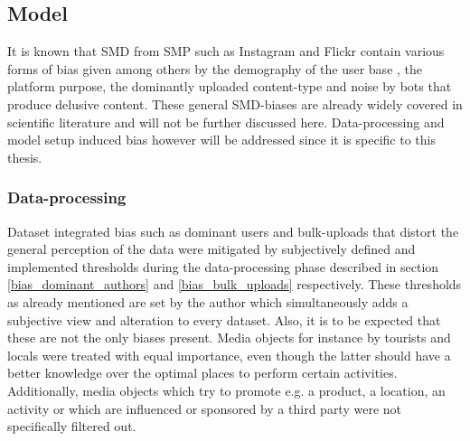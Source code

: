\subsection*{Model}
It is known that SMD from SMP such as Instagram and Flickr contain various forms of bias given among others by the demography of the user base \parencite{Heikinheimo2017}, the platform purpose, the dominantly uploaded content-type and noise by bots \parencite{Edwards2014} that produce delusive content. These general SMD-biases are already widely covered in scientific literature \parencite{Ruths2014, Lazer2014, Zook2017} and will not be further discussed here. Data-processing and model setup induced bias however will be addressed since it is specific to this thesis. \\

\subsubsection*{Data-processing} Dataset integrated bias such as dominant users and bulk-uploads that distort the general perception of the data were mitigated by subjectively defined and implemented thresholds during the data-processing phase described in section \ref{bias_dominant_authors} and \ref{bias_bulk_uploads} respectively. These thresholds as already mentioned are set by the author which simultaneously adds a subjective view and alteration to every dataset. Also, it is to be expected that these are not the only biases present. Media objects for instance by tourists and locals were treated with equal importance, even though the latter should have a better knowledge over the optimal places to perform certain activities. Additionally, media objects which try to promote e.g. a product, a location, an activity or which are influenced or sponsored by a third party were not specifically filtered out.\\

